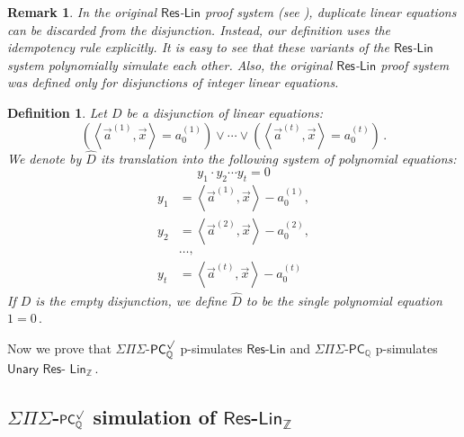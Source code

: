 \documentclass[11pt]{article}
\newtheorem{definition}[theorem]{Definition}
\newtheorem{remark}[theorem]{Remark}
\newcommand{\Q}{{\mathbb Q}}
\newcommand{\Z}{{\mathbb Z}}
\begin{document}
\begin{remark}
%
In the original $\mathsf{Res}$-$\mathsf{Lin}$ proof system (see  \cite{RT07}), duplicate linear equations can be discarded from the disjunction. Instead, our definition uses the \emph{idempotency} rule explicitly. It is easy to see that these variants of the $\mathsf{Res}$-$\mathsf{Lin}$ system polynomially simulate each other. Also, the original $\mathsf{Res}$-$\mathsf{Lin}$ proof system was defined only for disjunctions of \emph{integer} linear equations. %
\end{remark}




\begin{definition} 
Let $D$ be  a disjunction of linear equations:
\begin{equation*}
    \left(\left \langle \vec a^{(1)}, \vec x \right \rangle = a_0^{(1)}\right) \vee \cdots 
\vee \left(\left \langle \vec a^{(t)}, \vec x \right \rangle = a_0^{(t)}\right)\,. 
%
\end{equation*}
We denote by $\widehat{D} $ its translation into the following system of polynomial equations:
$$
   y_1 \cdot y_2 \cdots y_t = 0 
$$
\begin{align*}
    y_1 &= \left \langle \vec a^{(1)},  \vec x \right \rangle - a_0^{(1)}, \\ y_2 &=  \left \langle \vec a^{(2)}, \vec x \right \rangle - a_0^{(2)}, \\ &\ldots, \\  y_t &= \left \langle \vec a^{(t)}, \vec x \right \rangle - a_0^{(t)} %
\end{align*}
%
If $D$ is the empty disjunction, we define $\widehat{D} $ to be the single polynomial equation %
$1 = 0\,.$ %
%
\end{definition}

Now we prove that $\Sigma \Pi \Sigma$-$\mathsf{PC}_{\Q}^{\surd}$ p-simulates $\mathsf{Res}$-$\mathsf{Lin}$ and $\Sigma \Pi \Sigma$-$\mathsf{PC}_{\Q}$ p-simulates $\mathsf{Unary}$ $\mathsf{Res}$-%
$\mathsf{Lin}_\Z\,.$ %

\subsection{\texorpdfstring{$\Sigma \Pi \Sigma$-$\mathsf{PC}_\Q^{\surd}$}{SigmaPiSigma-PC-Q-sqrt}
 simulation of \texorpdfstring{$\mathsf{Res}$-$\mathsf{Lin}_{\Z}$}{Res-Lin-Z}}
\end{document}
